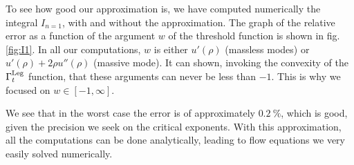To see how good our approximation is, we have computed numerically the integral $I_{n=1}$, with and without the approximation. The graph of the relative error as a function of the argument $w$ of the threshold function is shown in fig. \eqref{fig:I1}. In all our computations, $w$ is either $u'(\rho)$ (massless modes) or $u'(\rho) + 2 \rho u''(\rho)$ (massive mode). It can shown, invoking the convexity of the $\Gamma_t^{\text{Leg}}$ function, that these arguments can never be less than $-1$. This is why we focused on $w \in [-1, \infty]$.

We see that in the worst case the error is of approximately $0.2~\%$, which is good, given the precision we seek on the critical exponents.
With this approximation, all the computations can be done analytically, leading to flow equations we very easily solved numerically.